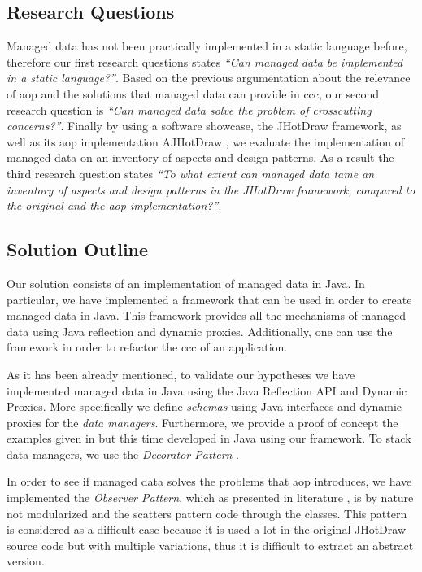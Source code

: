 \subsection{Research Questions}\label{Research Questions}
Managed data has not been practically implemented in a static language before, therefore our first research questions states 
\textit{``Can managed data be implemented in a static language?''}.
Based on the previous argumentation about the relevance of \ac{aop} and the solutions that managed data can provide in \acrlong{ccc}, our second research question is \textit{``Can managed data solve the problem of crosscutting concerns?''}. 
Finally by using a software showcase, the JHotDraw framework, as well as its \ac{aop} implementation AJHotDraw \cite{marinajhotdraw}, 
we evaluate the implementation of managed data on an inventory of aspects and design patterns. 
As a result the third research question states \textit{``To what extent can managed data tame an inventory of aspects and design patterns in the JHotDraw framework, compared to the original and the \ac{aop} implementation?''}.

\subsection{Solution Outline}\label{Solution Outline}
Our solution consists of an implementation of managed data in Java. 
In particular, we have implemented a framework that can be used in order to create managed data in Java.
This framework provides all the mechanisms of managed data using Java reflection and dynamic proxies. Additionally, one can use the framework in order to refactor the \ac{ccc} of an application.

As it has been already mentioned, to validate our hypotheses we have implemented managed data in Java using the Java Reflection API and Dynamic Proxies. 
More specifically we define \textit{schemas} using Java interfaces and dynamic proxies for the \textit{data managers}. 
Furthermore, we provide a proof of concept the examples given in \cite{loh2012managed} but this time developed in Java using our framework. 
To stack data managers\cite{loh2012managed}, we use the \textit{Decorator Pattern} \cite{gamma1995design}. 

In order to see if managed data solves the problems that \ac{aop} introduces, we have implemented the \textit{Observer Pattern}, which as presented in literature \cite{tourwe2003existence} \cite{hannemann2005role} \cite{marin2005approach}, is by nature not modularized and the scatters pattern code through the classes. 
This pattern is considered as a difficult case because it is used a lot in the original JHotDraw source code but with multiple variations, thus it is difficult to extract an abstract version.

